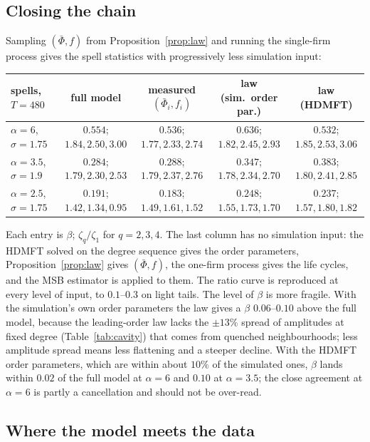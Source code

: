 \documentclass[11pt]{article}
\newcommand{\bPhi}{\bar\Phi}
\begin{document}
\subsection{Closing the chain}

Sampling $(\bPhi,f)$ from Proposition~\ref{prop:law} and running the single-firm process gives the
spell statistics with progressively less simulation input:

\begin{center}\footnotesize\setlength{\tabcolsep}{3pt}
\begin{tabular}{l|c|c|c|c}
\toprule
spells, $T=480$ & full model & measured $(\bPhi_i,f_i)$ & law (sim.\ order par.) & law (HDMFT)\\
\midrule
$\alpha=6$, $\sigma=1.75$   & $0.554$; $1.84,2.50,3.00$ & $0.536$; $1.77,2.33,2.74$ & $0.636$; $1.82,2.45,2.93$ & $0.532$; $1.85,2.53,3.06$\\
$\alpha=3.5$, $\sigma=1.9$  & $0.284$; $1.79,2.30,2.53$ & $0.288$; $1.79,2.37,2.76$ & $0.347$; $1.78,2.34,2.70$ & $0.383$; $1.80,2.41,2.85$\\
$\alpha=2.5$, $\sigma=1.75$ & $0.191$; $1.42,1.34,0.95$ & $0.183$; $1.49,1.61,1.52$ & $0.248$; $1.55,1.73,1.70$ & $0.237$; $1.57,1.80,1.82$\\
\bottomrule
\end{tabular}
\end{center}

\noindent Each entry is $\beta$; $\zeta_q/\zeta_1$ for $q=2,3,4$.  The last column has no simulation
input: the HDMFT solved on the degree sequence gives the order parameters,
Proposition~\ref{prop:law} gives $(\bPhi,f)$, the one-firm process gives the life cycles, and the
MSB estimator is applied to them.  The ratio curve is reproduced at every level of input, to
$0.1$--$0.3$ on light tails.  The level of $\beta$ is more fragile.  With the simulation's own order
parameters the law gives a $\beta$ $0.06$--$0.10$ above the full model, because the leading-order
law lacks the $\pm13\%$ spread of amplitudes at fixed degree (Table~\ref{tab:cavity}) that comes from
quenched neighbourhoods; less amplitude spread means less flattening and a steeper decline.  With
the HDMFT order parameters, which are within about $10\%$ of the simulated ones, $\beta$ lands within
$0.02$ of the full model at $\alpha=6$ and $0.10$ at $\alpha=3.5$; the close agreement at $\alpha=6$ is
partly a cancellation and should not be over-read.

\subsection{Where the model meets the data}
\label{sec:data}
\end{document}

